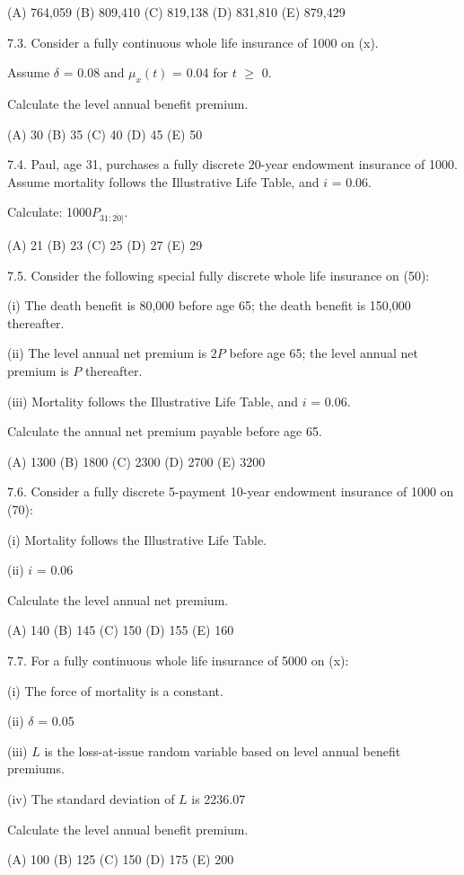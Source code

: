 \documentclass[]{book}
\begin{document}
(A) 764,059 (B) 809,410 (C) 819,138 (D) 831,810 (E) 879,429

7.3. Consider a fully continuous whole life insurance of 1000 on (x).

Assume \(\delta\) = 0.08 and \(\mu_x(t)\) = 0.04 for \(t\) \(\ge\) 0.

Calculate the level annual benefit premium.

(A) 30 (B) 35 (C) 40 (D) 45 (E) 50

7.4. Paul, age 31, purchases a fully discrete 20-year endowment
insurance of 1000. Assume mortality follows the Illustrative Life Table,
and \(i\) = 0.06.

Calculate: 1000\(P_{31 :\overline{20}|}\).

(A) 21 (B) 23 (C) 25 (D) 27 (E) 29

7.5. Consider the following special fully discrete whole life insurance
on (50):

(i) The death benefit is 80,000 before age 65; the death benefit is
150,000 thereafter.

(ii) The level annual net premium is \(2P\) before age 65; the level
annual net premium is \(P\) thereafter.

(iii) Mortality follows the Illustrative Life Table, and \(i\) = 0.06.

Calculate the annual net premium payable before age 65.

(A) 1300 (B) 1800 (C) 2300 (D) 2700 (E) 3200

7.6. Consider a fully discrete 5-payment 10-year endowment insurance of
1000 on (70):

(i) Mortality follows the Illustrative Life Table.

(ii) \(i\) = 0.06

Calculate the level annual net premium.

(A) 140 (B) 145 (C) 150 (D) 155 (E) 160

7.7. For a fully continuous whole life insurance of 5000 on (x):

(i) The force of mortality is a constant.

(ii) \(\delta\) = 0.05

(iii) \(L\) is the loss-at-issue random variable based on level annual
benefit premiums.

(iv) The standard deviation of \(L\) is 2236.07

Calculate the level annual benefit premium.

(A) 100 (B) 125 (C) 150 (D) 175 (E) 200
\end{document}

